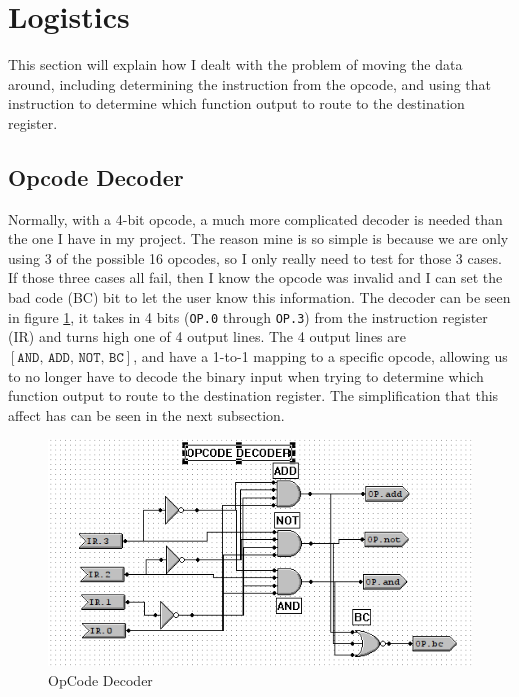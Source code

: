 \documentclass[a4paper,11pt]{article}
\begin{document}
\section{Logistics}
This section will explain how I dealt with the problem of moving the data around, including determining the instruction from the opcode, and using that instruction to determine which function output to route to the destination register.

\subsection{Opcode Decoder}
Normally, with a 4-bit opcode, a much more complicated decoder is needed than the one I have in my project. The reason mine is so simple is because we are only using 3 of the possible 16 opcodes, so I only really need to test for those 3 cases. If those three cases all fail, then I know the opcode was invalid and I can set the bad code (BC) bit to let the user know this information. The decoder can be seen in figure \ref{fig:opdecoder}, it takes in 4 bits (\texttt{OP.0} through \texttt{OP.3}) from the instruction register (IR) and turns high one of 4 output lines. The 4 output lines are $[\texttt{AND, ADD, NOT, BC}]$, and have a 1-to-1 mapping to a specific opcode, allowing us to no longer have to decode the binary input when trying to determine which function output to route to the destination register. The simplification that this affect has can be seen in the next subsection.

  \begin{figure}[h!]
       \includegraphics[width=5.4in]{pictures/opdecoder}
     \caption{OpCode Decoder}
     \label{fig:opdecoder}
  \end{figure} 
\end{document}
